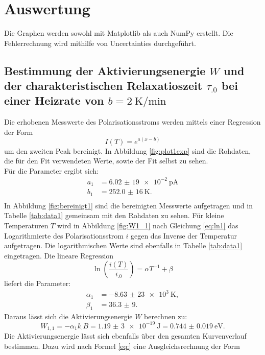 \section{Auswertung}
\label{sec:Auswertung}

Die Graphen werden sowohl mit Matplotlib \cite{matplotlib} als auch NumPy \cite{numpy} erstellt. Die Fehlerrechnung wird mithilfe von Uncertainties \cite{uncertainties} durchgeführt.

\subsection{Bestimmung der Aktivierungsenergie $W$ und der charakteristischen Relaxatioszeit $\tau_.0$ bei einer Heizrate von $b=\SI{2}{\kelvin\per\minute}$}

Die erhobenen Messwerte des Polarisationsstroms werden mittels einer Regression der Form
\begin{equation}
I(T)=e^{a(x-b)} \label{eq:reg1}
\end{equation}
um den zweiten Peak bereinigt. In Abbildung \ref{fig:plot1exp} sind die Rohdaten, die für den Fit verwendeten Werte, sowie der Fit selbst zu sehen.\\
Für die Parameter ergibt sich:
\begin{align*}
a_1&=\SI{6,02(19)e-2}{\pico\ampere}\\
b_1&=\SI{252,0(16)}{\kelvin}\text{.}\\
\end{align*}
In Abbildung \ref{fig:bereinigt1} sind die bereinigten Messwerte aufgetragen und in Tabelle \ref{tab:data1} gemeinsam mit den Rohdaten zu sehen.
Für kleine Temperaturen $T$ wird in Abbildung \ref{fig:W1_1} nach Gleichung \eqref{eq:ln1} das Logarithmierte des Polarisationsstrom $i$ gegen das Inverse der Temperatur aufgetragen. Die logarithmischen Werte sind ebenfalls in Tabelle \ref{tab:data1} eingetragen.
Die lineare Regression
\begin{equation}
\ln\left(\frac{i(T)}{i_.0}\right)=\alpha T^{-1}+\beta \label{eq:reg2}
\end{equation}
liefert die Parameter:
\begin{align*}
\alpha_1&=\SI{-8,63(23)e3}{\kelvin},\\
\beta_1 &= \num{36,3(9)}\text{.}
\end{align*}
Daraus lässt sich die Aktivierungsenergie $W$ berechnen zu:
\[
W_{1,1} = -\alpha_1 k_.B =\SI{1,19(3)e-19}{\joule}=\SI{0.744(19)}{\electronvolt}\text{.}
\]
Die Aktivierungsenergie lässt sich ebenfalls über den gesamten Kurvenverlauf bestimmen. Dazu wird nach Formel \eqref{eq:} eine Ausgleichsrechnung der Form 
